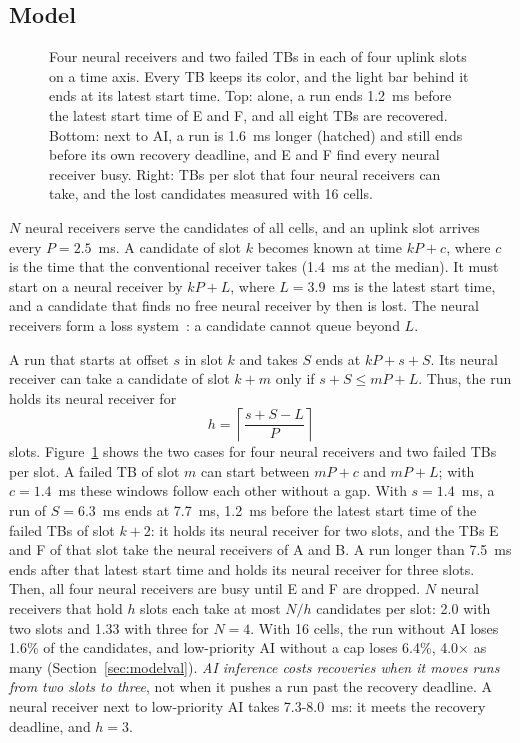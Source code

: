 \documentclass[acmsmall,screen,review,anonymous]{acmart}
\begin{document}
\subsection{Model}

\begin{figure}[t]
\centering
\resizebox{\linewidth}{!}{}
\caption{Four neural receivers and two failed TBs in each of four uplink slots on a time axis. Every TB
keeps its color, and the light bar behind it ends at its latest start time. Top: alone, a run ends 1.2~ms
before the latest start time of E and F, and all eight TBs are recovered. Bottom: next to AI, a run is
1.6~ms longer (hatched) and still ends before its own recovery deadline, and E and F find every neural
receiver busy. Right: TBs per slot that four neural receivers can take, and the lost candidates measured
with 16 cells.}
\label{fig:hold}
\end{figure}

$N$ neural receivers serve the candidates of all cells, and an uplink slot arrives every $P = 2.5$~ms. A
candidate of slot $k$ becomes known at time $kP + c$, where $c$ is the time that the conventional receiver
takes (1.4~ms at the median). It must start on a neural receiver by $kP + L$, where $L = 3.9$~ms is the
latest start time, and a candidate that finds no free neural receiver by then is lost. The neural receivers
form a loss system~\cite{harcholbalter}: a candidate cannot queue beyond $L$.

A run that starts at offset $s$ in slot $k$ and takes $S$ ends at $kP + s + S$. Its neural receiver can
take a candidate of slot $k+m$ only if $s + S \le mP + L$. Thus, the run holds its neural receiver for
\begin{equation}
h = \left\lceil \frac{s + S - L}{P} \right\rceil
\label{eq:hold}
\end{equation}
slots. Figure~\ref{fig:hold} shows the two cases for four neural receivers and two failed TBs per slot. A
failed TB of slot $m$ can start between $mP + c$ and $mP + L$; with $c = 1.4$~ms these windows follow each
other without a gap. With $s = 1.4$~ms, a run of $S = 6.3$~ms ends at 7.7~ms, 1.2~ms before the latest
start time of the failed TBs of slot $k+2$: it holds its neural receiver for two slots, and the TBs E and F
of that slot take the neural receivers of A and B. A run longer than 7.5~ms ends after that latest start
time and holds its neural receiver for three slots. Then, all four neural receivers are busy until E and
F are dropped. $N$ neural receivers that hold $h$ slots each take at most $N/h$ candidates per slot: 2.0
with two slots and 1.33 with three for $N = 4$. With 16 cells, the run without AI loses 1.6\% of the
candidates, and low-priority AI without a cap loses 6.4\%, 4.0$\times$ as many
(Section~\ref{sec:modelval}). \emph{AI inference costs recoveries when it moves runs from two slots to
three}, not when it pushes a run past the recovery deadline. A neural receiver next to low-priority AI takes
7.3-8.0~ms: it meets the recovery deadline, and $h = 3$.
\end{document}
